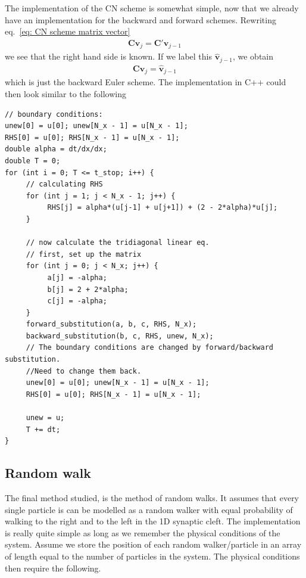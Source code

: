 \documentclass[twoside, 11pt]{article}
\begin{document}
			The implementation of the CN scheme is somewhat simple, now that we already have an implementation for the backward and forward schemes. Rewriting eq.~\eqref{eq: CN scheme matrix vector}
			\begin{align*}
				\mathbf{C}\mathbf{v}_j = \mathbf{C}'\mathbf{v}_{j-1}
			\end{align*}
			we see that the right hand side is known. If we label this $\hat{\mathbf{v}}_{j-1}$, we obtain
			\begin{align*}
				\mathbf{C}\mathbf{v}_j = \hat{\mathbf{v}}_{j-1}
			\end{align*}
			which is just the backward Euler scheme. The implementation in C++ could then look similar to the following
			\begin{lstlisting}
// boundary conditions:
unew[0] = u[0]; unew[N_x - 1] = u[N_x - 1];
RHS[0] = u[0]; RHS[N_x - 1] = u[N_x - 1];
double alpha = dt/dx/dx;
double T = 0;
for (int i = 0; T <= t_stop; i++) {
     // calculating RHS
     for (int j = 1; j < N_x - 1; j++) {
          RHS[j] = alpha*(u[j-1] + u[j+1]) + (2 - 2*alpha)*u[j];
     }
        
     // now calculate the tridiagonal linear eq.
     // first, set up the matrix
     for (int j = 0; j < N_x; j++) {
          a[j] = -alpha;
          b[j] = 2 + 2*alpha;
          c[j] = -alpha;
     }
     forward_substitution(a, b, c, RHS, N_x);
     backward_substitution(b, c, RHS, unew, N_x);
     // The boundary conditions are changed by forward/backward substitution. 
     //Need to change them back.
     unew[0] = u[0]; unew[N_x - 1] = u[N_x - 1];
     RHS[0] = u[0]; RHS[N_x - 1] = u[N_x - 1];
     
     unew = u;     
     T += dt;
}
			\end{lstlisting}
			
	
	\subsection{Random walk}
		The final method studied, is the method of random walks. It assumes that every single particle is can be modelled as a random walker with equal probability of walking to the right and to the left in the 1D synaptic cleft. The implementation is really quite simple as long as we remember the physical conditions of the system. Assume we store the position of each random walker/particle in an array of length equal to the number of particles in the system. The physical conditions then require the following.
		
\end{document}
